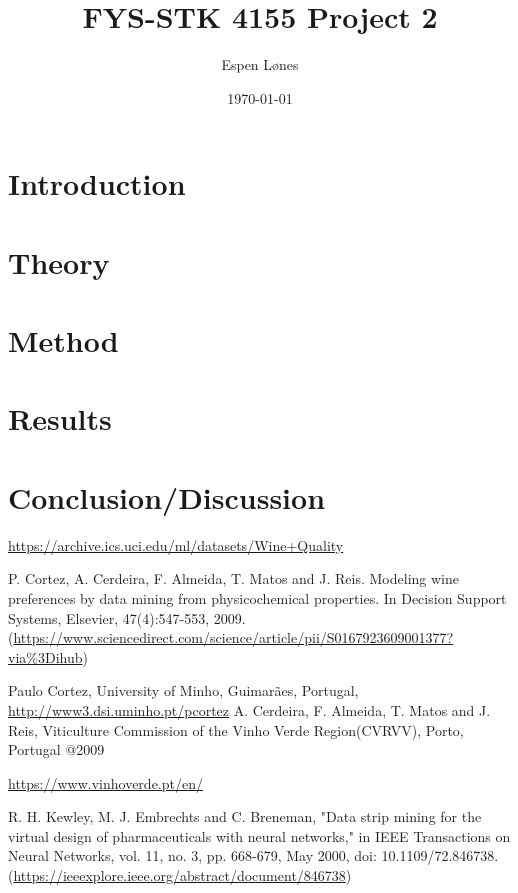\documentclass[12pt, letterpaper, twoside]{article}
\begin{document}
\title{FYS-STK 4155 Project 2}
\author{Espen Lønes}
\date{\today}
\maketitle
\section{Introduction}
\section{Theory}
\section{Method}
\section{Results}
\section{Conclusion/Discussion}
\begin{thebibliography}{9}
\url{https://archive.ics.uci.edu/ml/datasets/Wine+Quality}

P. Cortez, A. Cerdeira, F. Almeida, T. Matos and J. Reis. Modeling wine preferences by data mining from physicochemical properties. In Decision Support Systems, Elsevier, 47(4):547-553, 2009. (\url{https://www.sciencedirect.com/science/article/pii/S0167923609001377?via%3Dihub})

Paulo Cortez, University of Minho, Guimarães, Portugal, \url{http://www3.dsi.uminho.pt/pcortez}
A. Cerdeira, F. Almeida, T. Matos and J. Reis, Viticulture Commission of the Vinho Verde Region(CVRVV), Porto, Portugal
@2009

\url{https://www.vinhoverde.pt/en/}

R. H. Kewley, M. J. Embrechts and C. Breneman, "Data strip mining for the virtual design of pharmaceuticals with neural networks," in IEEE Transactions on Neural Networks, vol. 11, no. 3, pp. 668-679, May 2000, doi: 10.1109/72.846738. (\url{https://ieeexplore.ieee.org/abstract/document/846738})
\end{thebibliography}
\end{document}
